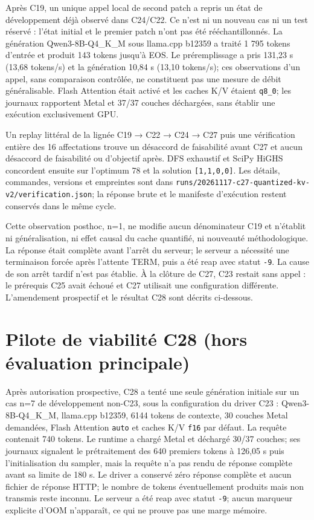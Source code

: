 \documentclass[11pt]{article}
\begin{document}
Après C19, un unique appel local de second patch a repris un état de développement déjà observé dans C24/C22. Ce n'est ni un nouveau cas ni un test réservé : l'état initial et le premier patch n'ont pas été rééchantillonnés. La génération Qwen3-8B-Q4\_K\_M sous llama.cpp b12359 a traité 1 795 tokens d'entrée et produit 143 tokens jusqu'à EOS. Le préremplissage a pris 131,23 s (13,68 tokens/s) et la génération 10,84 s (13,10 tokens/s); ces observations d'un appel, sans comparaison contrôlée, ne constituent pas une mesure de débit généralisable. Flash Attention était activé et les caches K/V étaient \texttt{q8\_\allowbreak{}0}; les journaux rapportent Metal et 37/37 couches déchargées, sans établir une exécution exclusivement GPU.

Un replay littéral de la lignée C19 → C22 → C24 → C27 puis une vérification entière des 16 affectations trouve un désaccord de faisabilité avant C27 et aucun désaccord de faisabilité ou d'objectif après. DFS exhaustif et SciPy HiGHS concordent ensuite sur l'optimum 78 et la solution \texttt{[\allowbreak{}1,\allowbreak{}1,\allowbreak{}0,\allowbreak{}0]\allowbreak{}}. Les détails, commandes, versions et empreintes sont dans \texttt{runs/\allowbreak{}20261117-\allowbreak{}c27-\allowbreak{}quantized-\allowbreak{}kv-\allowbreak{}v2/\allowbreak{}verificati\allowbreak{}on.json}; la réponse brute et le manifeste d'exécution restent conservés dans le même cycle.

Cette observation posthoc, n=1, ne modifie aucun dénominateur C19 et n'établit ni généralisation, ni effet causal du cache quantifié, ni nouveauté méthodologique. La réponse était complète avant l'arrêt du serveur; le serveur a nécessité une terminaison forcée après l'attente TERM, puis a été reap avec statut \texttt{-\allowbreak{}9}. La cause de son arrêt tardif n'est pas établie. À la clôture de C27, C23 restait sans appel : le prérequis C25 avait échoué et C27 utilisait une configuration différente. L'amendement prospectif et le résultat C28 sont décrits ci-dessous.

\section{Pilote de viabilité C28 (hors évaluation principale)}

Après autorisation prospective, C28 a tenté une seule génération initiale sur un cas n=7 de développement non-C23, sous la configuration du driver C23 : Qwen3-8B-Q4\_K\_M, llama.cpp b12359, 6144 tokens de contexte, 30 couches Metal demandées, Flash Attention \texttt{auto} et caches K/V \texttt{f16} par défaut. La requête contenait 740 tokens. Le runtime a chargé Metal et déchargé 30/37 couches; ses journaux signalent le prétraitement des 640 premiers tokens à 126,05 s puis l'initialisation du sampler, mais la requête n'a pas rendu de réponse complète avant sa limite de 180 s. Le driver a conservé zéro réponse complète et aucun fichier de réponse HTTP; le nombre de tokens éventuellement produits mais non transmis reste inconnu. Le serveur a été reap avec statut \texttt{-\allowbreak{}9}; aucun marqueur explicite d'OOM n'apparaît, ce qui ne prouve pas une marge mémoire.
\end{document}
